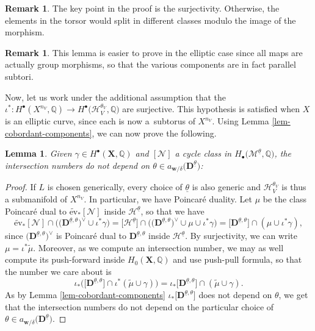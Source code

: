 \documentclass[pdftex]{sigma}
\newcommand{\ev}{\mathrm{ev}}
\newcommand{\QQ}{\mathbb{Q}}
\newcommand{\btheta}{ {\underline{\theta}} }
\newcommand{\bfX}{ {\boldsymbol X} }
\newcommand{\bfD}{ {\boldsymbol D} }
\newcommand{\bfw}{ {\boldsymbol w} }
\newcommand{\N}{\mathcal{N}}
\newcommand{\M}{\mathcal{M}}
\renewcommand{\H}{\mathcal{H}}
\numberwithin{equation}{section}
\newtheorem{lem}[theo]{Lemma}
\theoremstyle{definition}
\newtheorem{remarkk}[theo]{Remark}
\begin{document}
\begin{remarkk}
 The key point in the proof is the surjectivity. Otherwise, the elements in the torsor would split in different classes modulo the image of the morphism.
\end{remarkk}

\begin{remarkk}
 This lemma is easier to prove in the elliptic case since all maps are actually group morphisms, so that the various components are in fact parallel subtori.
\end{remarkk}

Now, let us work under the additional assumption that the $\iota^*\colon H^\bullet(X^{n_V},\QQ)\to H^\bullet\bigl(\H_V^{\theta_V},\QQ\bigr)$ are surjective. This hypothesis is satisfied when $X$ is an elliptic curve, since each \smash{$\H_V^{\theta_V}$} is now a~subtorus of $X^{n_V}$.
Using Lemma \ref{lem-cobordant-components}, we can now prove the following.

\begin{lem}\label{lem-equal-intersection-numbers}
Given $\gamma\in H^\bullet(\bfX,\QQ)$ and $[\N]$ a cycle class in $H_\bullet\bigl(\boldsymbol{\M}^\btheta,\QQ\bigr)$, the intersection numbers
\smash{$\widetilde{\ev}_*[\N]\cap\bigl(\bigl(\bfD^{\btheta,\theta}\bigr)^{\vee}\cup\iota^*\gamma\bigr) $}
do not depend on $\theta\in a_{\bfw/\delta}\bigl(\bfD^\btheta\bigr)$:
\end{lem}

\begin{proof}
If $L$ is chosen generically, every choice of $\btheta$ is also generic and $\H_V^{\theta_V}$ is thus a submanifold of $X^{n_V}$. In particular, we have Poincar\'e duality. Let $\mu$ be the class Poincar\'e dual to $\widetilde{\ev}_*[\N]$ inside $\boldsymbol{\H}^\btheta$, so that we have
\[ \widetilde{\ev}_*[\N]\cap \bigl(\bigl(\bfD^{\btheta,\theta}\bigr)^{\vee}\cup\iota^*\gamma\bigr) = \big[\boldsymbol{\H}^\btheta\big]\cap\bigl(\bigl(\bfD^{\btheta,\theta}\bigr)^{\vee}\cup\mu\cup\iota^*\gamma\bigr) = \big[\bfD^{\btheta,\theta}\big]\cap(\mu\cup\iota^*\gamma), \]
since $\bigl(\bfD^{\btheta,\theta}\bigr)^{\vee}$ is Poincar\'e dual to $\bfD^{\btheta,\theta}$ inside $\boldsymbol{\H}^\btheta$. By surjectivity, we can write $\mu=\iota^*\widetilde{\mu}$. Moreover, as we compute an intersection number, we may as well compute its push-forward inside $H_0(\bfX,\QQ)$ and use push-pull formula, so that the number we care about is
\[ \iota_*\bigl(\big[\bfD^{\btheta,\theta}\big]\cap\iota^*(\widetilde{\mu}\cup\gamma)\bigr) = \iota_*\big[\bfD^{\btheta,\theta}\big]\cap (\widetilde{\mu}\cup\gamma). \]
As by Lemma \ref{lem-cobordant-components} $\iota_*\big[\bfD^{\btheta,\theta}\big]$ does not depend on $\theta$, we get that the intersection numbers do not depend on the particular choice of $\theta\in a_{\bfw/\delta}\bigl(\bfD^\btheta\bigr)$.
\end{proof}
\end{document}
